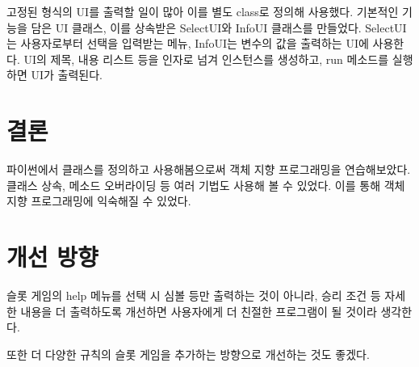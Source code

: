 \documentclass{article}
\begin{document}
고정된 형식의 UI를 출력할 일이 많아 이를 별도 class로 정의해 사용했다.
기본적인 기능을 담은 UI 클래스, 이를 상속받은 SelectUI와 InfoUI 클래스를 만들었다.
SelectUI는 사용자로부터 선택을 입력받는 메뉴, InfoUI는 변수의 값을 출력하는 UI에 사용한다.
UI의 제목, 내용 리스트 등을 인자로 넘겨 인스턴스를 생성하고, run 메소드를 실행하면 UI가 출력된다.

\section{결론}

파이썬에서 클래스를 정의하고 사용해봄으로써 객체 지향 프로그래밍을 연습해보았다.
클래스 상속, 메소드 오버라이딩 등 여러 기법도 사용해 볼 수 있었다.
이를 통해 객체 지향 프로그래밍에 익숙해질 수 있었다.

\section{개선 방향}

슬롯 게임의 help 메뉴를 선택 시 심볼 등만 출력하는 것이 아니라,
승리 조건 등 자세한 내용을 더 출력하도록 개선하면 사용자에게 더 친절한 프로그램이 될 것이라 생각한다.

또한 더 다양한 규칙의 슬롯 게임을 추가하는 방향으로 개선하는 것도 좋겠다.
\end{document}
